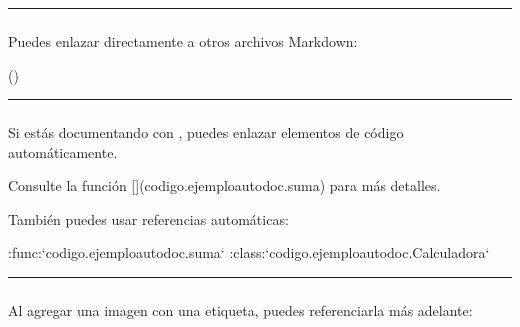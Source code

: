\documentclass[a4paper,10pt,spanish]{sphinxmanual}
\begin{document}
\bigskip\hrule\bigskip



\subsubsection{}
\label{\detokenize{configuracion_inicial/013.guia_de_myst_parser:referencias-cruzadas-a-archivos}}
\sphinxAtStartPar
Puedes enlazar directamente a otros archivos Markdown:

\begin{sphinxVerbatim}()
\end{sphinxVerbatim}


\bigskip\hrule\bigskip



\subsubsection{}
\label{\detokenize{configuracion_inicial/013.guia_de_myst_parser:referencias-a-funciones-clases-y-metodos-autodoc}}
\sphinxAtStartPar
Si estás documentando con , puedes enlazar elementos de código automáticamente.

\begin{sphinxVerbatim}[commandchars=\\\{\}]
Consulte la función [](codigo.ejemplo\PYGZus{}autodoc.suma) para más detalles.
\end{sphinxVerbatim}

\sphinxAtStartPar
También puedes usar referencias automáticas:

\begin{sphinxVerbatim}[commandchars=\\\{\}]
:func:`codigo.ejemplo\PYGZus{}autodoc.suma`
:class:`codigo.ejemplo\PYGZus{}autodoc.Calculadora`
\end{sphinxVerbatim}


\bigskip\hrule\bigskip



\subsubsection{}
\label{\detokenize{configuracion_inicial/013.guia_de_myst_parser:referencias-a-figuras-e-imagenes}}
\sphinxAtStartPar
Al agregar una imagen con una etiqueta, puedes referenciarla más adelante:
\end{document}
